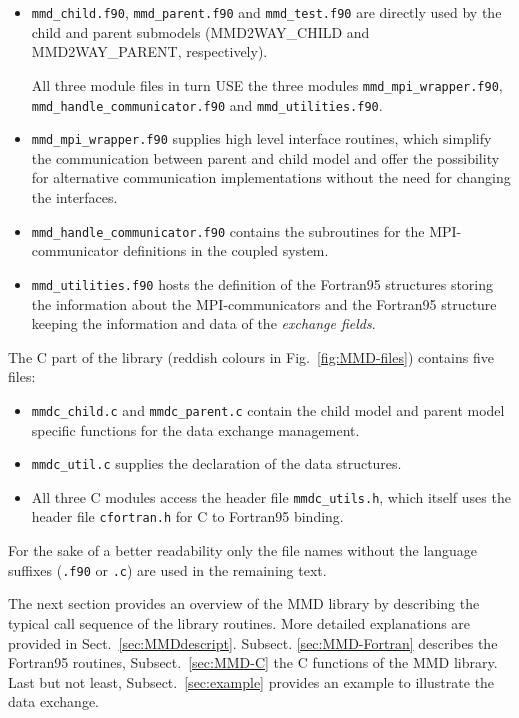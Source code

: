 \documentclass[twoside]{article}
\begin{document}
\begin{itemize}
\item \verb|mmd_child.f90|, 
\verb|mmd_parent.f90| and \verb|mmd_test.f90| are directly used by
the child and parent submodels (MMD2WAY\_CHILD and MMD2WAY\_PARENT,
 respectively). 

 All three module files in turn USE the three modules 
\verb|mmd_mpi_wrapper.f90|, \verb|mmd_handle_communicator.f90|  and 
\verb|mmd_utilities.f90|. 
\item \verb|mmd_mpi_wrapper.f90| supplies high level 
interface routines, which simplify the communication between parent and child
model 
and offer the possibility for alternative communication implementations without
 the need for changing the interfaces.
\item \verb|mmd_handle_communicator.f90|
contains the subroutines for the MPI-communicator definitions in the coupled
system. 
\item \verb|mmd_utilities.f90|  hosts the 
definition of the Fortran95 structures storing the information about the
MPI-communicators and the Fortran95 structure keeping the
information and data of the {\it exchange fields}.
\end{itemize}

The C part of the library (reddish colours in
Fig.\ \ref{fig:MMD-files}) contains five files:
\begin{itemize}
\item  \verb|mmdc_child.c| and \verb|mmdc_parent.c| contain the child model and 
parent model specific functions for the data exchange management. 
\item \verb|mmdc_util.c| supplies the declaration 
of the data structures. 
\item All three C modules access the header file 
\verb|mmdc_utils.h|, which itself uses the header
file \verb|cfortran.h| for C to Fortran95 binding. 
\end{itemize}
For the sake of a better readability only the file names without the language 
suffixes (\verb|.f90| or \verb|.c|) are used in the remaining text.

The next section provides an overview of the MMD library by describing the 
typical call sequence of the library routines. More detailed explanations 
 are provided in  Sect.\ \ref{sec:MMDdescript}. Subsect. 
\ref{sec:MMD-Fortran} describes the Fortran95 routines, Subsect.\ 
\ref{sec:MMD-C} the C functions of the MMD library. Last but not least,
 Subsect.\ \ref{sec:example} provides an example to illustrate the data 
exchange. 
\end{document}
